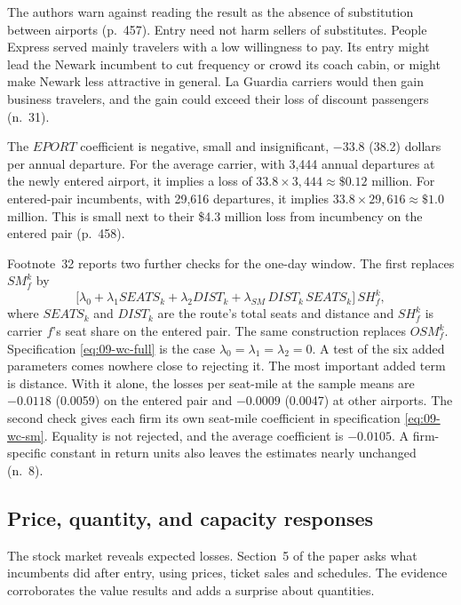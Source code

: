 The authors warn against reading the result as the absence of substitution between airports
(p.~457). Entry need not harm sellers of substitutes. People Express served mainly travelers
with a low willingness to pay. Its entry might lead the Newark incumbent to cut frequency or crowd its
coach cabin, or might make Newark less attractive in general. La Guardia carriers would then gain
business travelers, and the gain could exceed their loss of discount passengers (n.~31).

The $\mathit{EPORT}$ coefficient is negative, small and insignificant, $-33.8$ (38.2) dollars per annual
departure. For the average carrier, with 3,444 annual departures at the newly entered airport, it
implies a loss of $33.8\times3{,}444\approx\$0.12$ million. For entered-pair incumbents, with 29,616
departures, it implies $33.8\times29{,}616\approx\$1.0$ million. This is small next to their \$4.3
million loss from incumbency on the entered pair (p.~458).

Footnote~32 reports two further checks for the one-day window. The first replaces $\mathit{SM}^k_f$ by
\begin{equation*}
\big[\lambda_0+\lambda_1\mathit{SEATS}_k+\lambda_2\mathit{DIST}_k+\lambda_{SM}\,\mathit{DIST}_k\,
\mathit{SEATS}_k\big]\,\mathit{SH}^k_f ,
\end{equation*}
where $\mathit{SEATS}_k$ and $\mathit{DIST}_k$ are the route's total seats and distance and
$\mathit{SH}^k_f$ is carrier $f$'s seat share on the entered pair. The same construction replaces
$\mathit{OSM}^k_f$. Specification \eqref{eq:09-wc-full} is the case $\lambda_0=\lambda_1=\lambda_2=0$. A test of
the six added parameters comes nowhere close to rejecting it. The most important added term is
distance. With it alone, the losses per seat-mile at the sample means are $-0.0118$ (0.0059) on the
entered pair and $-0.0009$ (0.0047) at other airports. The second check gives each firm its own
seat-mile coefficient in specification \eqref{eq:09-wc-sm}. Equality is not rejected, and the average
coefficient is $-0.0105$. A firm-specific constant in return units also leaves the estimates nearly
unchanged (n.~8).

\subsection{Price, quantity, and capacity responses}\label{sec:09-wc-did}

The stock market reveals expected losses. Section~5 of the paper asks what incumbents did after entry,
using prices, ticket sales and schedules. The evidence corroborates the value results and adds a
surprise about quantities.

